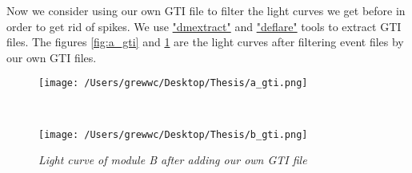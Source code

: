 \documentclass[12pt]{report}
\newcommand{\mycaption}[1]{\caption{\textit{\footnotesize #1}}}
\begin{document}
        \indent Now we consider using our own GTI file to filter the light curves we get before in order to get 
        rid of spikes.
        We use \href{http://cxc.harvard.edu/ciao/ahelp/dmextract.html}{"dmextract"} and 
        \href{http://cxc.harvard.edu/ciao/ahelp/deflare.html}{"deflare"} tools to extract GTI files. The figures 
        \ref{fig:a_gti} and \ref{fig:b_gti} are the light curves after filtering event files by our own GTI files. 
        \begin{figure}[!ht] 
          \begin{minipage}{1\textwidth}
            \begin{center} 
                \texttt{[image: /Users/grewwc/Desktop/Thesis/a\_gti.png]}
                \mycaption{Light curve of module A after adding our own GTI file}
                \label{fig:a_gti}
            \end{center}
            \end{minipage}
            \\
          \begin{minipage}{1\textwidth}
          \begin{center}
            \texttt{[image: /Users/grewwc/Desktop/Thesis/b\_gti.png]}
            \mycaption{Light curve of module B after adding our own GTI file}
            \label{fig:b_gti}
            \end{center}
          \end{minipage}
          \centering
        \end{figure}
\end{document}
